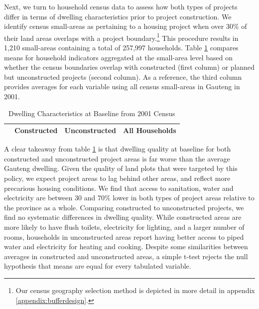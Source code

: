 \documentclass[12pt]{article}
\begin{document}
Next, we turn to household census data to assess how both types of projects differ in terms of dwelling characteristics prior to project construction. We identify census small-areas as pertaining to a housing project when over 30\% of their land areas overlaps with a project boundary.\footnote{Our census geography selection method is depicted in more detail in appendix \ref{appendix:bufferdesign}.} This procedure results in 1,210 small-areas containing a total of 257,997 households. Table \ref{table:projectdescriptivescensus} compares means for household indicators aggregated at the small-area level based on whether the census boundaries overlap with constructed (first column) or planned but unconstructed projects (second column). As a reference, the third column provides averages for each variable using all census small-areas in Gauteng in 2001. 
 

\begin{table}[h!]
	\centering
	\caption{Dwelling Characteristics at Baseline from 2001 Census}\label{table:projectdescriptivescensus}
\vspace{-2mm}
\begin{tabular}{l*{1}{ccc}}
\toprule
& Constructed & Unconstructed & All Households \\
\midrule
 
\bottomrule
\end{tabular}
\end{table}

A clear takeaway from table \ref{table:projectdescriptivescensus} is that dwelling quality at baseline for both constructed and unconstructed project areas is far worse than the average Gauteng dwel\-ling. Given the quality of land plots that were targeted by this policy, we expect project areas to lag behind other areas, and reflect more precarious housing conditions. We find that access to sanitation, water and electricity are between 30 and 70\% lower in both types of project areas relative to the province as a whole. Comparing constructed to unconstructed projects, we find no systematic differences in dwelling quality. While constructed areas are more likely to have flush toilets, electricity for lighting, and a larger number of rooms, households in unconstructed areas report having better access to piped water and electricity for heating and cooking. Despite some similarities between averages in constructed and unconstructed areas, a simple t-test rejects the null hypothesis that means are equal for every tabulated variable.%
\end{document}
